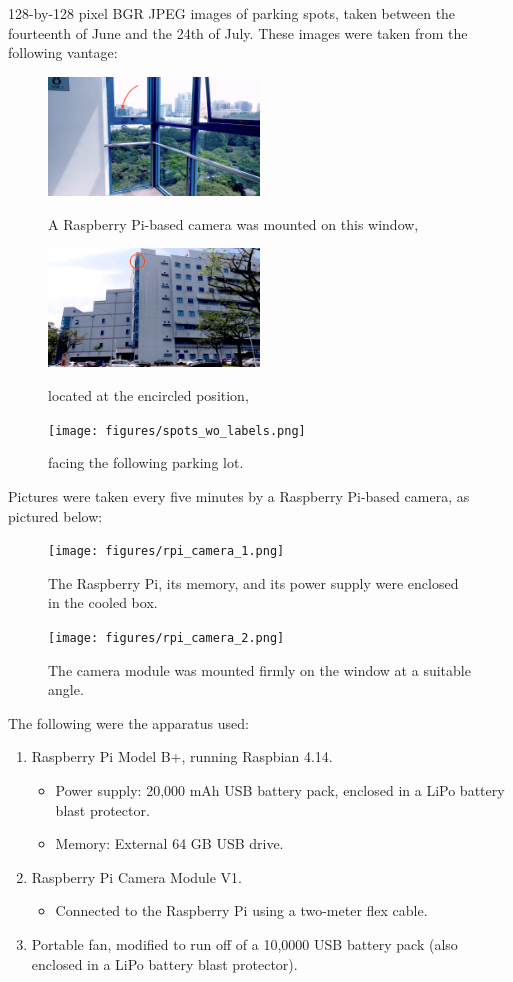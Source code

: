 \documentclass[a4paper, 11pt]{article} %
\begin{document}
		128-by-128 pixel BGR JPEG images of 
		parking spots, taken between the fourteenth of June and the 24th of July. These images were taken 
		from the following vantage:
		\vskip 5mm
		\begin{figure}[H]
			\centering
			\includegraphics[width=0.5\textwidth]{figures/context_1.jpg}
			\caption{A Raspberry Pi-based camera was mounted on this window,}
			\vskip 5mm
			\includegraphics[width=0.5\textwidth]{figures/context_2.jpg}
			\caption{located at the encircled position,}
			\vskip 5mm
			\texttt{[image: figures/spots\_wo\_labels.png]}
			\caption{facing the following parking lot.}
		\end{figure}
		\vskip -5mm
		\hspace*{-6mm}Pictures were taken every five minutes by a Raspberry 
		Pi-based camera, as pictured below:
		\vskip 5mm
		\begin{figure}[H]
			\centering
			\texttt{[image: figures/rpi\_camera\_1.png]}
			\caption{The Raspberry Pi, its memory, and its power supply were 
			enclosed in the cooled box.}
			\vskip 5mm
			\texttt{[image: figures/rpi\_camera\_2.png]}
			\caption{The camera module was mounted firmly on the window at a 
			suitable angle.}
		\end{figure}
		\hspace*{-6mm}The following were the apparatus used:
		\begin{enumerate}
			\item Raspberry Pi Model B+, running Raspbian 4.14.
			\vskip -5mm
			\begin{itemize}
				\item[] Power supply: 20,000 mAh USB battery pack, enclosed in 
				a LiPo battery blast protector.
				\item[] Memory: External 64 GB USB drive.
			\end{itemize}
			\item Raspberry Pi Camera Module V1.
			\begin{itemize}
				\item[] Connected to the Raspberry Pi using a two-meter flex cable.
			\end{itemize}
			\item Portable fan, modified to run off of a 10,0000 USB battery 
			pack (also enclosed in a LiPo battery blast protector).
		\end{enumerate}
\end{document}
